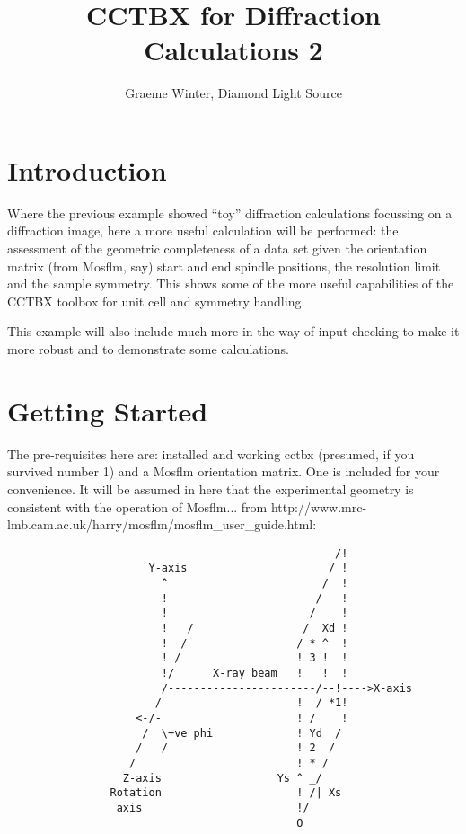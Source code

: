 \documentclass[a4paper, 11pt]{article}
\title{CCTBX for Diffraction Calculations 2}
\author{Graeme Winter, Diamond Light Source}
\begin{document}
\maketitle

\section{Introduction}

Where the previous example showed ``toy'' diffraction calculations focussing on a diffraction image, here a more useful calculation will be performed: the assessment of the geometric completeness of a data set given the orientation matrix (from Mosflm, say) start and end spindle positions, the resolution limit and the sample symmetry. This shows some of the more useful capabilities of the CCTBX toolbox for unit cell and symmetry handling.

This example will also include much more in the way of input checking to make it more robust and to demonstrate some calculations.

\section{Getting Started}

The pre-requisites here are: installed and working cctbx (presumed, if you survived number 1) and a Mosflm orientation matrix. One is included for your convenience. It will be assumed in here that the experimental geometry is consistent with the operation of Mosflm... from
http://www.mrc-lmb.cam.ac.uk/harry/mosflm/mosflm\_user\_guide.html:

{\small
\begin{verbatim}
                                                   /!
                      Y-axis                      / !
                        ^                        /  !
                        !                       /   !
                        !                      /    !
                        !   /                 /  Xd !
                        !  /                 / * ^  !
                        ! /                  ! 3 !  !
                        !/      X-ray beam   !   !  !
                        /-----------------------/--!---->X-axis
                       /                     !  / *1!
                    <-/-                     ! /    !
                     /  \+ve phi             ! Yd  /
                    /   /                    ! 2  /
                   /                         ! * /
                  Z-axis                  Ys ^ _/ 
                Rotation                     ! /| Xs
                 axis                        !/
                                             O          
\end{verbatim}
}
\end{document}
